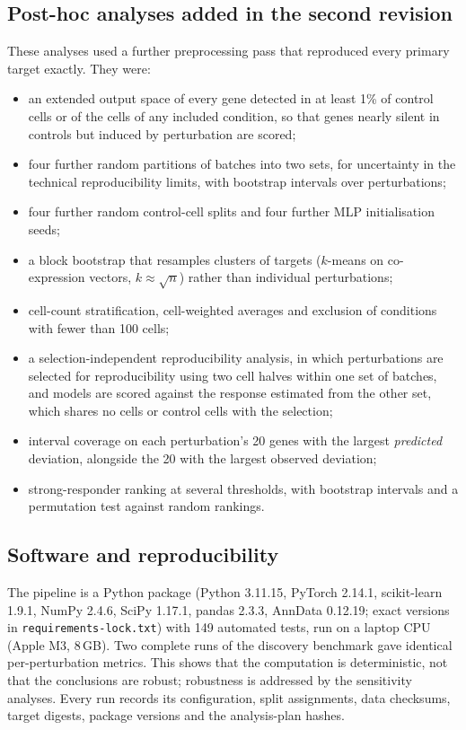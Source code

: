 \subsection{Post-hoc analyses added in the second revision}
These analyses used a further preprocessing pass that reproduced every primary target exactly. They were:
\begin{itemize}
\item an extended output space of every gene detected in at least 1\% of control cells or of the cells of any included condition, so that genes nearly silent in controls but induced by perturbation are scored;
\item four further random partitions of batches into two sets, for uncertainty in the technical reproducibility limits, with bootstrap intervals over perturbations;
\item four further random control-cell splits and four further MLP initialisation seeds;
\item a block bootstrap that resamples clusters of targets ($k$-means on co-expression vectors, $k\approx\sqrt{n}$) rather than individual perturbations;
\item cell-count stratification, cell-weighted averages and exclusion of conditions with fewer than 100 cells;
\item a selection-independent reproducibility analysis, in which perturbations are selected for reproducibility using two cell halves within one set of batches, and models are scored against the response estimated from the other set, which shares no cells or control cells with the selection;
\item interval coverage on each perturbation's 20 genes with the largest \emph{predicted} deviation, alongside the 20 with the largest observed deviation;
\item strong-responder ranking at several thresholds, with bootstrap intervals and a permutation test against random rankings.
\end{itemize}

\subsection{Software and reproducibility}
The pipeline is a Python package (Python 3.11.15, PyTorch 2.14.1, scikit-learn 1.9.1, NumPy 2.4.6, SciPy 1.17.1, pandas 2.3.3, AnnData 0.12.19; exact versions in \texttt{requirements-lock.txt}) with 149 automated tests, run on a laptop CPU (Apple M3, 8\,GB). Two complete runs of the discovery benchmark gave identical per-perturbation metrics. This shows that the computation is deterministic, not that the conclusions are robust; robustness is addressed by the sensitivity analyses. Every run records its configuration, split assignments, data checksums, target digests, package versions and the analysis-plan hashes.
